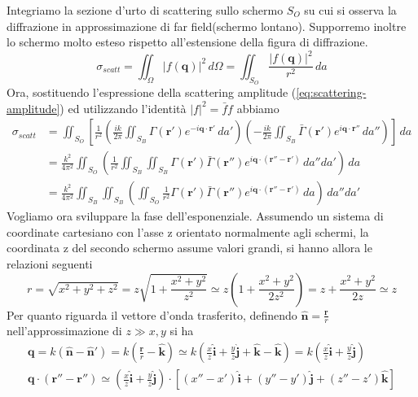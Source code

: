 \begin{fullwidth}
    Integriamo la sezione d'urto di scattering sullo schermo $ S_O$ su cui si osserva la diffrazione in approssimazione di
    far field(schermo lontano).
    Supporremo inoltre lo schermo molto esteso rispetto all'estensione della figura di diffrazione.
    \[
        \sigma_{scatt} = \iint_{\Omega} |f(\bm{q})|^2 \, d \Omega = \iint_{S_O} \frac{|f(\bm{q})|^2}{r^2} \, da
    \]
    Ora, sostituendo l'espressione della scattering amplitude (\ref{eq:scattering-amplitude}) ed utilizzando l'identità
    $ |f|^2 = \bar{f}f$ abbiamo
    \begin{align}
        \sigma_{scatt} &= \iint_{S_O} \left[
            \frac{1}{{r}^{2}} \left(
            \frac{ik}{2 \pi} \iint_{S_B} \Gamma(\bm{r}')
            e^{-i \bm{q} \cdot \bm{r}'} \, da'
            \right)
            \left( - \frac{ik}{2 \pi} \iint_{S_B} \bar{\Gamma}(\bm{r}') e^{i \bm{q} \cdot \bm{r}''} \, da'' \right)
            \right] \,  da  \nonumber \\
        & =  \frac{{k}^{2}}{4 \pi^2} \iint_{S_O} \left( \frac{1}{{r}^{2}} \iint_{S_B}  \iint_{S_B}
        \Gamma(\bm{r}') \bar{\Gamma}(\bm{r}'') e^{i \bm{q} \cdot (\bm{r}''-\bm{r}')} \, da'' da' \right) \, da \nonumber\\
        & = \frac{{k}^{2}}{4 \pi^2}  \iint_{S_B}  \iint_{S_B}\left(\iint_{S_O} \frac{1}{{r}^{2}}
        \Gamma(\bm{r}') \bar{\Gamma}(\bm{r}'') e^{i \bm{q} \cdot (\bm{r}''-\bm{r}')} \, da \right) \, da'' da'
        \label{eq:sigma-scattering-1}
    \end{align}
    Vogliamo ora sviluppare la fase dell'esponenziale.
    Assumendo un sistema di coordinate cartesiano con l’asse z orientato normalmente agli schermi, la coordinata z
    del secondo schermo assume valori grandi, si hanno allora le relazioni seguenti
    \[
    r = \sqrt{ x^{2}+y^{2}+z^{2} } = z \sqrt{ 1+ \frac{x^{2}+y^{2}}{z^{2}} } \simeq z \left( 1 + \frac{x^{2}+y^{2}}{2z^{2}} \right)
    = z + \frac{x^{2}+y^{2}}{2z} \simeq z
    \]
    Per quanto riguarda il vettore d'onda trasferito, definendo $\hat{ \bm{n}} = \frac{\bm{r}}{r}$ nell'approssimazione
    di $z \gg x,y$ si ha
    \begin{gather*}
        \bm{q} = k (\hat{\bm{n}} - \hat{\bm{n}}') = k \left( \frac{\bm{r}}{r}  - \hat{\bm{k}}\right) \simeq k\left( \frac{x}{z}\hat{\bm{i}} + \frac{y}{z} \hat{\bm{j}} + \hat{\bm{k}} -\hat{\bm{k}}\right) = k\left( \frac{x}{z} \hat{\bm{i}} +\frac{y}{z} \hat{\bm{j}} \right)\\
        \bm{q} \cdot (\bm{r}'' - \bm{r}'') \simeq \left( \frac{x}{z} \hat{\bm{i}} + \frac{y}{z} \hat{\bm{j}} \right) \cdot [(x''-x')\hat{\bm{i}} + (y''-y')\hat{\bm{j}}+(z''-z')\hat{\bm{k}}]

\end{gather*}
\end{fullwidth}
